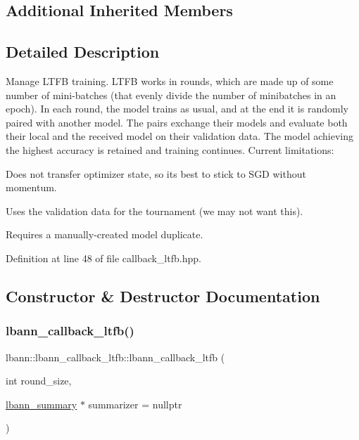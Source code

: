 \subsection*{Additional Inherited Members}


\subsection{Detailed Description}
Manage L\+T\+FB training. L\+T\+FB works in rounds, which are made up of some number of mini-\/batches (that evenly divide the number of minibatches in an epoch). In each round, the model trains as usual, and at the end it is randomly paired with another model. The pairs exchange their models and evaluate both their local and the received model on their validation data. The model achieving the highest accuracy is retained and training continues. Current limitations\+:
\begin{DoxyItemize}
\item Does not transfer optimizer state, so it\textquotesingle{}s best to stick to S\+GD without momentum.
\item Uses the validation data for the tournament (we may not want this).
\item Requires a manually-\/created model duplicate. 
\end{DoxyItemize}

Definition at line 48 of file callback\+\_\+ltfb.\+hpp.



\subsection{Constructor \& Destructor Documentation}
\mbox{\label{classlbann_1_1lbann__callback__ltfb_a44cb8fdfa7aae5d35543e47f3105f8cb}} 
\subsubsection{\texorpdfstring{lbann\+\_\+callback\+\_\+ltfb()}{lbann\_callback\_ltfb()}\hspace{0.1cm}{\footnotesize\ttfamily [1/2]}}
{\footnotesize\ttfamily lbann\+::lbann\+\_\+callback\+\_\+ltfb\+::lbann\+\_\+callback\+\_\+ltfb (\begin{DoxyParamCaption}\item[{int}]{round\+\_\+size,  }\item[{\hyperlink{classlbann_1_1lbann__summary}{lbann\+\_\+summary} $\ast$}]{summarizer = {\ttfamily nullptr} }\end{DoxyParamCaption})}

